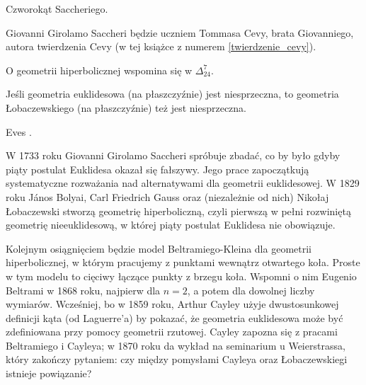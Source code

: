 \begin{definition}
	Czworokąt Saccheriego. %
\end{definition}


Giovanni Girolamo Saccheri będzie uczniem Tommasa Cevy, brata Giovanniego, autora twierdzenia Cevy (w tej książce z numerem \ref{twierdzenie_cevy}). %

O geometrii hiperbolicznej wspomina się w $\Delta_{24}^7$. %

\begin{proposition}
	Jeśli geometria euklidesowa (na płaszczyźnie) jest niesprzeczna, to geometria Łobaczewskiego (na płaszczyźnie) też jest niesprzeczna. %
\end{proposition}

Eves \cite[s. 347-353]{eves1_1972}. %

W 1733 roku Giovanni Girolamo Saccheri spróbuje zbadać, co by było gdyby piąty postulat Euklidesa okazał się fałszywy. %
Jego prace zapoczątkują systematyczne rozważania nad alternatywami dla geometrii euklidesowej. %
W 1829 roku János Bolyai, Carl Friedrich Gauss oraz (niezależnie od nich) Nikołaj Łobaczewski stworzą geometrię hiperboliczną, czyli pierwszą w pełni rozwiniętą geometrię nieeuklidesową, w której piąty postulat Euklidesa nie obowiązuje. %

Kolejnym osiągnięciem będzie model Beltramiego-Kleina dla geometrii hiperbolicznej, w którym pracujemy z punktami wewnątrz otwartego koła. %
Proste w tym modelu to cięciwy łączące punkty z brzegu koła. %
Wspomni o nim Eugenio Beltrami w 1868 roku, najpierw dla $n = 2$, a potem dla dowolnej liczby wymiarów. %
Wcześniej, bo w 1859 roku, Arthur Cayley użyje dwustosunkowej definicji kąta (od Laguerre'a) by pokazać, że geometria euklidesowa może być zdefiniowana przy pomocy geometrii rzutowej. %
Cayley zapozna się z pracami Beltramiego i Cayleya; w 1870 roku da wykład na seminarium u Weierstrassa, który zakończy pytaniem: czy między pomysłami Cayleya oraz Łobaczewskiegi istnieje powiązanie? %


